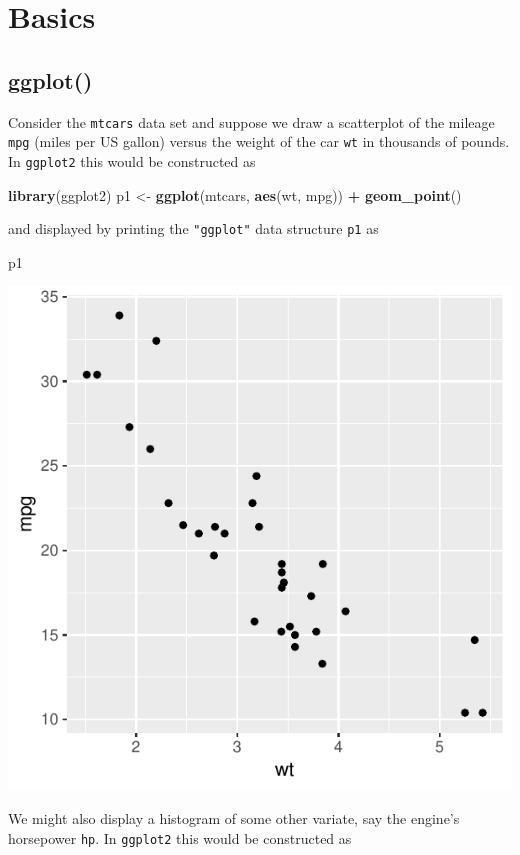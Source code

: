 \documentclass[]{article}
\newenvironment{Shaded}{\begin{snugshade}}{\end{snugshade}}
\newcommand{\KeywordTok}[1]{\textcolor[rgb]{0.13,0.29,0.53}{\textbf{#1}}}
\newcommand{\StringTok}[1]{\textcolor[rgb]{0.31,0.60,0.02}{#1}}
\newcommand{\OperatorTok}[1]{\textcolor[rgb]{0.81,0.36,0.00}{\textbf{#1}}}
\newcommand{\NormalTok}[1]{#1}
\begin{document}
\section{Basics}\label{basics}

\subsection{ggplot()}\label{ggplot}

Consider the \texttt{mtcars} data set and suppose we draw a scatterplot
of the mileage \texttt{mpg} (miles per US gallon) versus the weight of
the car \texttt{wt} in thousands of pounds. In \texttt{ggplot2} this
would be constructed as

\begin{Shaded}
\begin{Highlighting}[]
\KeywordTok{library}\NormalTok{(ggplot2)}
\NormalTok{p1 <-}\StringTok{ }\KeywordTok{ggplot}\NormalTok{(mtcars, }\KeywordTok{aes}\NormalTok{(wt, mpg)) }\OperatorTok{+}\StringTok{ }\KeywordTok{geom_point}\NormalTok{()}
\end{Highlighting}
\end{Shaded}

and displayed by printing the \texttt{"ggplot"} data structure
\texttt{p1} as

\begin{Shaded}
\begin{Highlighting}[]
\NormalTok{p1 }
\end{Highlighting}
\end{Shaded}

\begin{center}\includegraphics[width=0.5\linewidth]{ggplots2loon_files/figure-latex/mpg vs wt ggplot display-1} \end{center}

We might also display a histogram of some other variate, say the
engine's horsepower \texttt{hp}. In \texttt{ggplot2} this would be
constructed as
\end{document}
